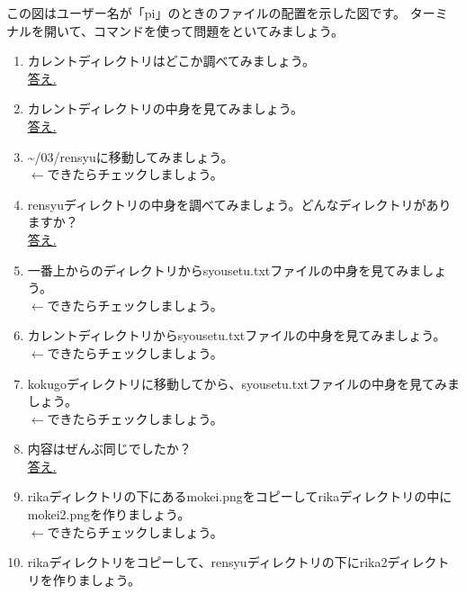 
\begin{tcolorbox}[title=\useOmetoi,breakable]
\begin{figure}[H]
    \centering
    
\end{figure}
この図はユーザー名が「pi」のときのファイルの配置を示した図です。
ターミナルを開いて、コマンドを使って問題をといてみましょう。\\
\begin{enumerate}
\item カレントディレクトリはどこか調べてみましょう。\\
\underline{答え.\hspace{0.8\linewidth}}
\item カレントディレクトリの中身を見てみましょう。\\
\underline{答え.\hspace{0.8\linewidth}}
\item \textasciitilde /03/rensyuに移動してみましょう。\\
\fbox{\phantom{白}} $\leftarrow$できたらチェックしましょう。
\item rensyuディレクトリの中身を調べてみましょう。どんなディレクトリがありますか？\\
\underline{答え.\hspace{0.8\linewidth}}
\item 一番上からのディレクトリからsyousetu.txtファイルの中身を見てみましょう。\\
\fbox{\phantom{白}} $\leftarrow$できたらチェックしましょう。
\item カレントディレクトリからsyousetu.txtファイルの中身を見てみましょう。\\
\fbox{\phantom{白}} $\leftarrow$できたらチェックしましょう。
\item kokugoディレクトリに移動してから、syousetu.txtファイルの中身を見てみましょう。\\
\fbox{\phantom{白}} $\leftarrow$できたらチェックしましょう。
\item 内容はぜんぶ同じでしたか？\\
\underline{答え.\hspace{0.8\linewidth}}
\item rikaディレクトリの下にあるmokei.pngをコピーしてrikaディレクトリの中にmokei2.pngを作りましょう。\\
\fbox{\phantom{白}} $\leftarrow$できたらチェックしましょう。
\item rikaディレクトリをコピーして、rensyuディレクトリの下にrika2ディレクトリを作りましょう。\\

\end{enumerate}
\end{tcolorbox}
